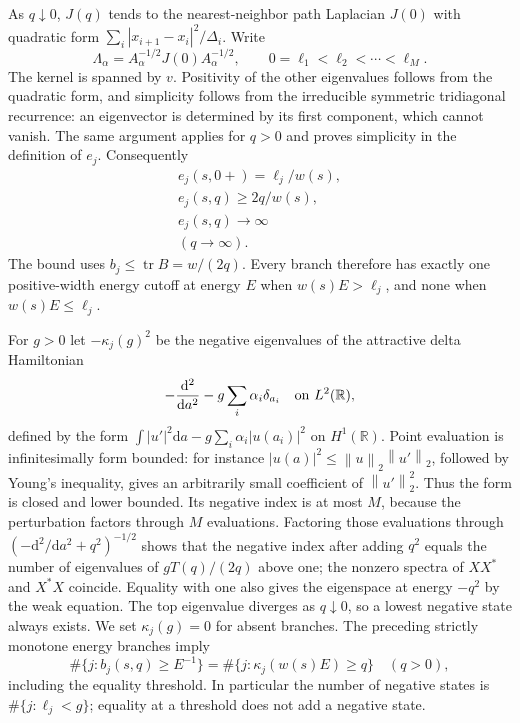 \documentclass[aps,pra,reprint,superscriptaddress,longbibliography]{revtex4-2}
\newcommand{\dd}{\mathrm d}
\newcommand{\norm}[1]{\left\lVert#1\right\rVert}
\begin{document}
As $q\downarrow0$, $J(q)$ tends to the nearest-neighbor path Laplacian
$J(0)$ with quadratic form
$\sum_i|x_{i+1}-x_i|^2/\Delta_i$.  Write
\begin{equation}
 \Lambda_\alpha=A_\alpha^{-1/2}J(0)A_\alpha^{-1/2},
 \qquad 0=\ell_1<\ell_2<\cdots<\ell_M.
 \label{sgt:geo:thresholds}
\end{equation}
The kernel is spanned by $v$.  Positivity of the other eigenvalues
follows from the quadratic form, and simplicity follows from the
irreducible symmetric tridiagonal recurrence: an eigenvector is
determined by its first component, which cannot vanish.  The same
argument applies for $q>0$ and proves simplicity in the definition of
$e_j$.  Consequently
\[
\begin{gathered}
 e_j(s,0+)=\ell_j/w(s),\\
 e_j(s,q)\geq2q/w(s),
 \\
 e_j(s,q)\longrightarrow\infty\\
(q\to\infty).
\end{gathered}
\]
The bound uses $b_j\leq\operatorname{tr}B=w/(2q)$.
Every branch therefore has exactly one positive-width energy cutoff
at energy $E$ when $w(s)E>\ell_j$, and none when $w(s)E\leq\ell_j$.

For $g>0$ let $-\kappa_j(g)^2$ be the negative eigenvalues of the
attractive delta Hamiltonian
\[
 -\frac{\dd^2}{\dd a^2}-g\sum_i\alpha_i\delta_{a_i}
 \quad\hbox{on }L^2(\mathbb R),
\]
defined by the form
$\int|u'|^2\dd a-g\sum_i\alpha_i|u(a_i)|^2$ on $H^1(\mathbb R)$.
Point evaluation is infinitesimally form bounded: for instance
$|u(a)|^2\leq\norm{u}_2\norm{u'}_2$, followed by Young's inequality,
gives an arbitrarily small coefficient of $\norm{u'}_2^2$.
Thus the form is closed and lower bounded.  Its negative index is at
most $M$, because the perturbation factors through $M$ evaluations.
Factoring those evaluations through
$(-\dd^2/\dd a^2+q^2)^{-1/2}$ shows that the negative index after adding
$q^2$ equals the number of eigenvalues of $gT(q)/(2q)$ above one;
the nonzero spectra of $XX^*$ and $X^*X$ coincide.  Equality with one
also gives the eigenspace at energy $-q^2$ by the weak equation.
The top eigenvalue diverges as $q\downarrow0$, so a lowest negative
state always exists.  We set $\kappa_j(g)=0$ for absent branches.
The preceding strictly monotone energy branches imply
\begin{equation}
 \#\{j:b_j(s,q)\geq E^{-1}\}
 =\#\{j:\kappa_j(w(s)E)\geq q\}\quad(q>0),
 \label{sgt:geo:birman-schwinger}
\end{equation}
including the equality threshold.  In particular the number of
negative states is $\#\{j:\ell_j<g\}$; equality at a threshold does
not add a negative state.
\end{document}
